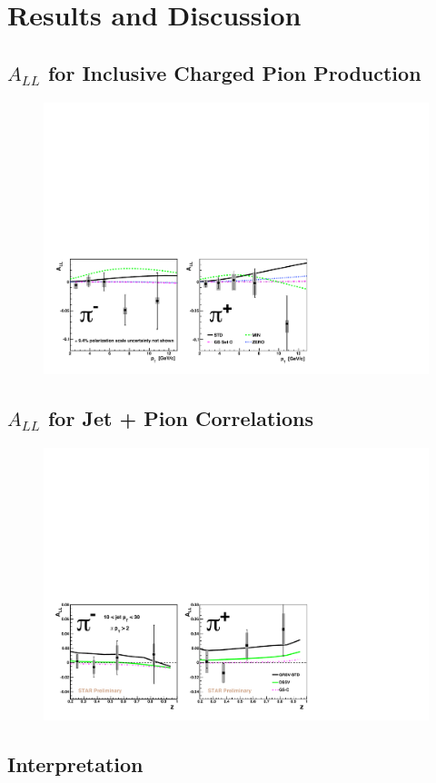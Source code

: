 \chapter{Results and Discussion}

\section{$A_{LL}$ for Inclusive Charged Pion Production}

\begin{figure}[ht]
  \includegraphics[width=1.0\textwidth]{figures/final-result-run5}
  \label{fig:final-result-run5}
\end{figure}

\section{$A_{LL}$ for Jet + Pion Correlations}

\begin{figure}[]
  \includegraphics[width=1.0\textwidth]{figures/final-result-run6}
  \label{fig:final-result-run6}
\end{figure}

\section{Interpretation}
